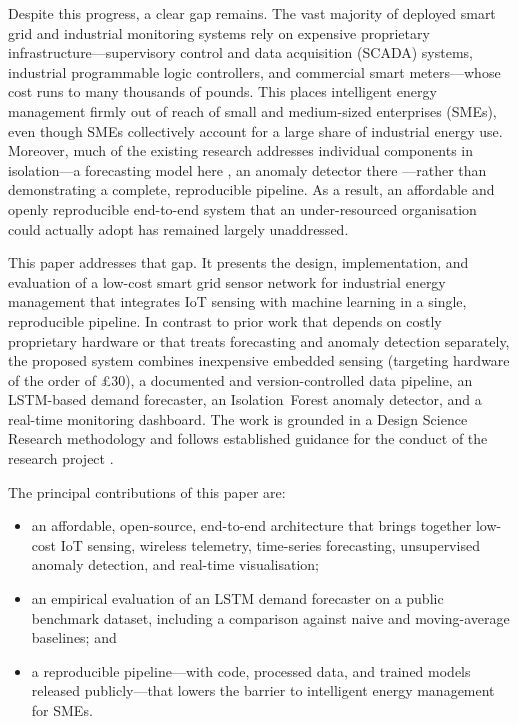 \documentclass[conference]{IEEEtran}
\begin{document}
Despite this progress, a clear gap remains. The vast majority of deployed smart
grid and industrial monitoring systems rely on expensive proprietary
infrastructure---supervisory control and data acquisition (SCADA) systems,
industrial programmable logic controllers, and commercial smart meters---whose
cost runs to many thousands of pounds. This places intelligent energy management
firmly out of reach of small and medium-sized enterprises (SMEs), even though
SMEs collectively account for a large share of industrial energy use. Moreover,
much of the existing research addresses individual components in isolation---a
forecasting model here \cite{wen2024deep}, an anomaly detector there
\cite{pereira2018unsupervised}---rather than demonstrating a complete,
reproducible pipeline. As a result, an affordable and openly reproducible
end-to-end system that an under-resourced organisation could actually adopt has
remained largely unaddressed.

This paper addresses that gap. It presents the design, implementation, and
evaluation of a low-cost smart grid sensor network for industrial energy
management that integrates IoT sensing with machine learning in a single,
reproducible pipeline. In contrast to prior work that depends on costly
proprietary hardware or that treats forecasting and anomaly detection
separately, the proposed system combines inexpensive embedded sensing (targeting
hardware of the order of \pounds30), a documented and version-controlled data
pipeline, an LSTM-based demand forecaster, an Isolation~Forest anomaly detector,
and a real-time monitoring dashboard. The work is grounded in a Design Science
Research methodology \cite{hevner2004design,peffers2007design} and follows
established guidance for the conduct of the research project
\cite{zina2021essential}.

\noindent The principal contributions of this paper are:
\begin{itemize}
  \item an affordable, open-source, end-to-end architecture that brings together
        low-cost IoT sensing, wireless telemetry, time-series forecasting,
        unsupervised anomaly detection, and real-time visualisation;
  \item an empirical evaluation of an LSTM demand forecaster on a public
        benchmark dataset, including a comparison against naive and
        moving-average baselines; and
  \item a reproducible pipeline---with code, processed data, and trained models
        released publicly---that lowers the barrier to intelligent energy
        management for SMEs.
\end{itemize}
\end{document}
